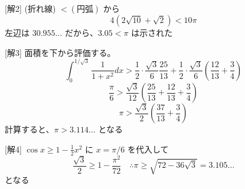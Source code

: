 \documentclass[../main.tex]{subfiles}
\begin{document}
[解2] (折れ線) $< (\text{円弧})$ から
$$4(2\sqrt{10} + \sqrt{2}) < 10\pi$$
左辺は $30.955\dots$ だから、$3.05 < \pi$ は示された

[解3] 面積を下から評価する。
$$\int_0^{1/\sqrt{3}} \frac{1}{1+x^2} dx > \frac{1}{2} \cdot \frac{\sqrt{3}}{6} \frac{25}{13} + \frac{1}{2} \cdot \frac{\sqrt{3}}{6} \left( \frac{12}{13} + \frac{3}{4} \right)$$
$$\frac{\pi}{6} > \frac{\sqrt{3}}{12} \left( \frac{25}{13} + \frac{12}{13} + \frac{3}{4} \right)$$
$$\pi > \frac{\sqrt{3}}{2} \left( \frac{37}{13} + \frac{3}{4} \right)$$
計算すると、$\pi > 3.114\dots$ となる

[解4] $\cos x \ge 1 - \frac{1}{2}x^2$ に $x = \pi/6$ を代入して
$$\frac{\sqrt{3}}{2} \ge 1 - \frac{\pi^2}{72} \quad \therefore \pi \ge \sqrt{72-36\sqrt{3}} = 3.105\dots$$
となる
\end{document}
